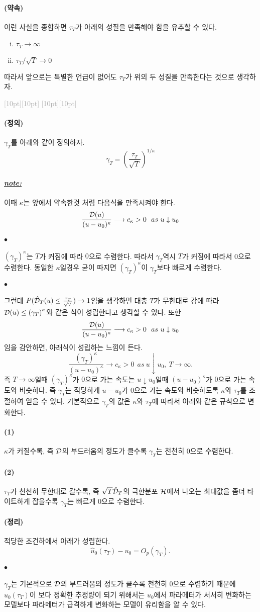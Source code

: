 \documentclass[12pt,oneside,english]{book}
\newcommand{\rdash}{\noindent \textcolor{darkgray}{ \raisebox{-1.9pt}[10pt][10pt]{\leafright} \hrulefill \raisebox{-1.9pt}[10pt][10pt]{\leafright \decofourleft \decothreeleft  \aldineright \decotwo \floweroneleft \decoone}}}
\def\ck{\paragraph{\large$\bullet$}\large}
\def\dfn{\paragraph{\large(정의)}\large}
\def\thm{\paragraph{\large(정리)}\large}
\def\promise{\paragraph{\large(약속)}\large}
\def\note{\paragraph{\large\textit{\underline{note:}}}\large}
\def\one{\paragraph{\large(1)}\large}
\def\two{\paragraph{\large(2)}\large}
\begin{document}
\promise 이런 사실을 종합하면 $\tau_T$가 아래의 성질을 만족해야 함을 유추할 수 있다. 
\begin{enumerate}[(i)]
\item  $\tau_T \longrightarrow \infty$ 
\item  $\tau_T/\sqrt{T} \longrightarrow 0$ 
\end{enumerate}
따라서 앞으로는 특별한 언급이 없어도 $\tau_T$가 위의 두 성질을 만족한다는 것으로 생각하자. 

\rdash 

\dfn
$\gamma_T$를 아래와 같이 정의하자. 
$$\gamma_T=\left(\frac{\tau_T}{\sqrt{T}}\right)^{1 / \kappa}$$

\note 이때 $\kappa$는 앞에서 약속한것 처럼 다음식을 만족시켜야 한다. 
$$\frac{{\cal D}(u)}{(u-u_0)^{\kappa}} \longrightarrow c_{\kappa} >0~~as~ u\downarrow u_0$$

\ck $\left(\gamma_T\right)^{\kappa}$는 $T$가 커짐에 따라 $0$으로 수렴한다. 따라서 $\gamma_T$역시 $T$가 커짐에 따라서 0으로 수렴한다. 동일한 $\kappa$일경우 굳이 따지면 $\left(\gamma_T\right)^{\kappa}$이 $\gamma_T$보다 빠르게 수렴한다. 

\ck 
그런데 $P(\hat{\cal D}_T(u)\leq \frac{\tau_T}{\sqrt{T}}) \rightarrow 1$임을 생각하면 대충 $T$가 무한대로 감에 따라 ${\cal D}(u)\leq \left(\gamma_T\right)^{\kappa}$와 같은 식이 성립한다고 생각할 수 있다. 또한 
$$\frac{{\cal D}(u)}{(u-u_0)^{\kappa}} \longrightarrow c_{\kappa} >0~~as~ u\downarrow u_0$$
임을 감안하면, 아래식이 성립하는 느낌이 든다. 
$$\frac{\left(\gamma_T\right)^{\kappa}}{(u-u_0)^{\kappa}} \longrightarrow c_{\kappa} >0~~as~ u\downarrow u_0,~T\rightarrow \infty.$$
즉 $T \rightarrow \infty$일때 $(\gamma_T)^{\kappa}$가 $0$으로 가는 속도는 $u\downarrow u_0$일때 $(u-u_0)^{\kappa}$가 $0$으로 가는 속도와 비슷하다. 즉 $\gamma_T$는 적당하게 $u-u_0$가 $0$으로 가는 속도와 비슷하도록 $\kappa$와 $\tau_T$를 조절하여 얻을 수 있다. 기본적으로 $\gamma_T$의 값은 $\kappa$와 $\tau_T$에 따라서 아래와 같은 규칙으로 변화한다. 

\one $\kappa$가 커질수록, 즉 $\cal D$의 부드러움의 정도가 클수록 $\gamma_T$는 천천히 0으로 수렴한다. 

\two $\tau_T$가 천천히 무한대로 갈수록, 즉 $\sqrt{T}\hat{\cal D}_T$의 극한분포 $\cal H$에서 나오는 최대값을 좀더 타이트하게 잡을수록 $\gamma_T$는 빠르게 0으로 수렴한다. 

\thm 적당한 조건하에서 아래가 성립한다. 
$$\hat{u}_0(\tau_T)-u_0=O_p(\gamma_T).$$

\ck $\gamma_T$는 기본적으로 $\cal D$의 부드러움의 정도가 클수록 천천히 0으로 수렴하기 때문에 $\hat{u}_0(\tau_T)$이 보다 정확한 추정량이 되기 위해서는 $u_0$에서 파라메터가 서서히 변화하는 모델보다 파라메터가 급격하게 변화하는 모델이 유리함을 알 수 있다. 
\end{document}
